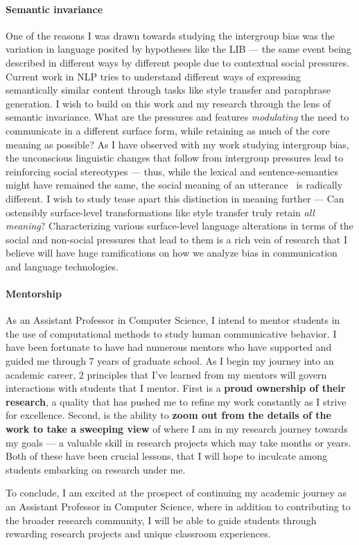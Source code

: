 \documentclass[11pt, letterpaper, biblatex]{practical-report}
\begin{document}
\paragraph{Semantic invariance} One of the reasons I was drawn towards studying the intergroup bias was the variation in language posited by hypotheses like the LIB --- the same event being described in different ways by different people due to contextual social pressures. Current work in NLP tries to understand different ways of expressing semantically similar content through tasks like style transfer and paraphrase generation. I wish to build on this work and my research through the lens of semantic invariance. What are the pressures and features \emph{modulating} the need to communicate in a different surface form, while retaining as much of the core meaning as possible? As I have observed with my work studying intergroup bias, the unconscious linguistic changes that follow from intergroup pressures lead to reinforcing social stereotypes --- thus, while the lexical and sentence-semantics might have remained the same, the social meaning of an utterance~\citep{eckert2005variation} is radically different. I wish to study tease apart this distinction in meaning further --- Can ostensibly surface-level transformations like style transfer truly retain \emph{all meaning}? Characterizing various surface-level language alterations in terms of the social and non-social pressures that lead to them is a rich vein of research that I believe will have huge ramifications on how we analyze bias in communication and language technologies.

\paragraph{Mentorship} As an Assistant Professor in Computer Science, I intend to mentor students in the use of computational methods to study human communicative behavior. I have been fortunate to have had numerous mentors who have supported and guided me through 7 years of graduate school. As I begin my journey into an academic career, 2 principles that I've learned from my mentors will govern interactions with students that I mentor. First is a \textbf{proud ownership of their research}, a quality that has pushed me to refine my work constantly as I strive for excellence. Second, is the ability to \textbf{zoom out from the details of the work to take a sweeping view} of where I am in my research journey towards my goals --- a valuable skill in research projects which may take months or years. Both of these have been crucial lessons, that I will hope to inculcate among students embarking on research under me.

To conclude, I am excited at the prospect of continuing my academic journey as an Assistant Professor in Computer Science, where in addition to contributing to the broader research community, I will be able to guide students through rewarding research projects and unique classroom experiences.

\printbibliography[title=References]
\end{document}
